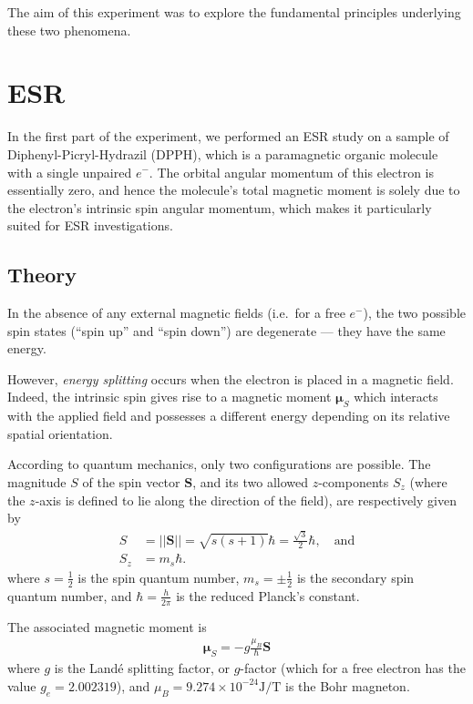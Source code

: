 \documentclass[a4paper]{jpconf}
\numberwithin{equation}{section}
\begin{document}
The aim of this experiment was to explore the fundamental principles underlying these two phenomena.

\section{ESR}
In the first part of the experiment, we performed an ESR study on a sample of Diphenyl-Picryl-Hydrazil (DPPH), which is a paramagnetic organic molecule with a single unpaired $e^-$. The orbital angular momentum of this electron is essentially zero,    %
and hence the molecule\textquoteright s total magnetic moment is solely due to the electron\textquoteright s intrinsic spin angular momentum, which makes it particularly suited for ESR investigations.
 
\subsection{Theory}\label{section: theory}
In the absence of any external magnetic fields (i.e.\ for a free $e^-$), the two possible spin states (``spin up'' and ``spin down'') are degenerate --- they have the same energy.

However, \emph{energy splitting} occurs when the electron is placed in a magnetic field. Indeed, the intrinsic spin gives rise to a magnetic moment $\bm{\mu}_S$ which interacts with the applied field and possesses a different energy depending on its relative spatial orientation. 

According to quantum mechanics, only two configurations are possible. The magnitude $S$ of the spin vector $\mathbf{S}$, and its two allowed $z$-components $S_z$ (where the $z$-axis is defined to lie along the direction of the field), are respectively given by
\begin{align}
	S &= \lvert\lvert\mathbf{S}\rvert\rvert = \sqrt{s(s+1)}\hbar = \tfrac{\sqrt{3}}{2}\hbar,  \quad \text{and} \nonumber \\
	S_z &= m_s \hbar. \label{eqn: magnetic moment z-projection}
\end{align}
where $s=\tfrac12$ is the spin quantum number, $m_s=\pm\tfrac12$ is the secondary spin quantum number, and $\hbar = \tfrac{h}{2 \pi}$ is the reduced Planck\textquoteright s constant.

The associated magnetic moment is
\begin{align}
	\bm{\mu}_S = - g \frac{\mu_B}{\hbar} \mathbf{S} \label{eqn: magnetic moment}
\end{align}
where $g$ is the Land\'e splitting factor, or $g$-factor (which for a free electron has the value $g_e = 2.002319$), and $\mu_B = 9.274 \times 10^{-24} \si{\joule\per\tesla}$ is the Bohr magneton. 
\end{document}
